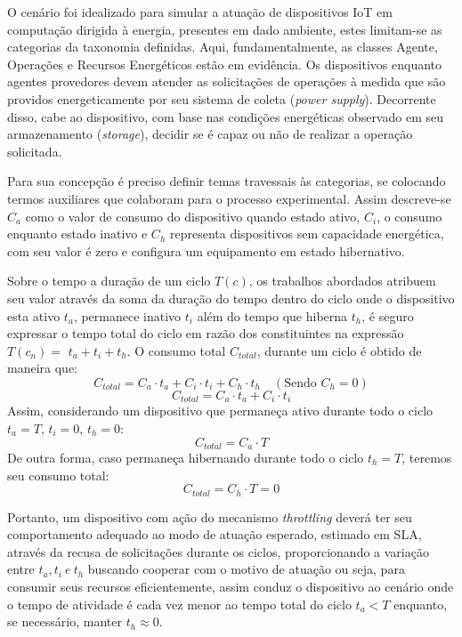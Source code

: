 O cenário foi idealizado para simular a atuação de dispositivos \acs{IoT} em computação dirigida à energia, presentes em dado ambiente, estes limitam-se as categorias da taxonomia definidas.  Aqui, fundamentalmente, as classes Agente, Operações e Recursos Energéticos estão em evidência. Os dispositivos enquanto agentes provedores devem atender as solicitações de operações à medida que são providos energeticamente por seu sistema de coleta (\textit{power supply}). Decorrente disso, cabe ao dispositivo, com base nas condições energéticas observado em seu armazenamento (\textit{storage}), decidir se é capaz ou não de realizar a operação solicitada. 

Para sua concepção é preciso definir temas travessais às categorias, se colocando termos auxiliares que colaboram para o processo experimental. Assim descreve-se \( C_a \) como o valor de consumo do dispositivo quando estado ativo, \( C_i \), o consumo enquanto estado inativo e \( C_h \) representa dispositivos sem capacidade energética, com seu valor é zero e configura um equipamento em estado hibernativo. 

Sobre o tempo a duração de um ciclo $T(c)$, os trabalhos abordados atribuem seu valor através da soma da duração do tempo dentro do ciclo onde o dispositivo esta ativo \( t_a \), permanece inativo \( t_i \) além do tempo que hiberna \( t_h \), é seguro expressar o tempo total do ciclo em razão dos constituintes na expressão $T(c_n) = $ \( t_a + t_i + t_h \). O consumo total $C_{total}$, durante um ciclo é obtido de maneira que:
\[C_{total} = C_a \cdot t_a + C_i \cdot t_i + C_h \cdot t_h \quad (\text{Sendo }C_h = 0)\]
\[C_{total} = C_a \cdot t_a + C_i \cdot t_i\]
Assim, considerando um dispositivo que permaneça ativo durante todo o ciclo \( t_a = T \), \( t_i = 0 \), \( t_h = 0 \):
\[ C_{total} = C_a \cdot T \]
De outra forma, caso permaneça hibernando durante todo o ciclo \( t_h = T \), teremos seu consumo total:
\[ C_{total} = C_h \cdot T = 0 \]

Portanto, um dispositivo com ação do mecanismo \textit{throttling} deverá ter seu comportamento adequado ao modo de atuação esperado, estimado em \acs{SLA}, através da recusa de solicitações durante os ciclos, proporcionando a variação entre $ t_a, t_i \ e\ t_h$ buscando cooperar com o motivo de atuação ou seja, para consumir seus recursos eficientemente, assim conduz o dispositivo ao cenário onde o tempo de atividade é cada vez menor ao tempo total do ciclo \( t_a < T \) enquanto, se necessário, manter $t_h \approx 0$.

